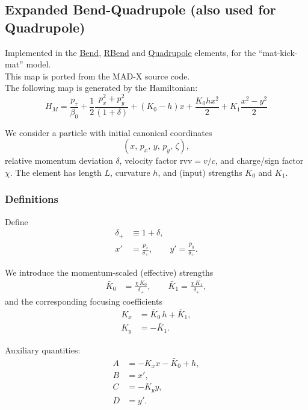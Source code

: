 \subsection{Expanded Bend-Quadrupole (also used for Quadrupole)}

Implemented in the \href{https://xsuite.readthedocs.io/en/latest/apireference.html#bend}{\underline{Bend}},
\href{https://xsuite.readthedocs.io/en/latest/apireference.html#rbend}{\underline{RBend}} and
\href{https://xsuite.readthedocs.io/en/latest/apireference.html#quadrupole}{\underline{Quadrupole}} elements,
for the ``mat-kick-mat'' model.
~\\
This map is ported from the MAD-X source code.
~\\

The following map is generated by the Hamiltonian:
\begin{equation}
  H_{M} = \frac{p_\tau}{\beta_0} +  \frac{1}{2}\frac{p_x^2 + p_y^2}{(1 + \delta)} + (K_0 -h)x + \frac{K_0hx^2}{2} + K_1 \frac{x^2-y^2}{2}
\end{equation}

We consider a particle with initial canonical coordinates
\[
(x,\, p_x,\, y,\, p_y,\, \zeta),
\]
relative momentum deviation $\delta$, velocity factor $\mathrm{rvv}=v/c$, and charge/sign factor $\chi$.
The element has length $L$, curvature $h$, and (input) strengths $K_0$ and $K_1$.

\subsubsection*{Definitions}

Define
\begin{align}
\delta_+ &\equiv 1+\delta, \\
x' &= \frac{p_x}{\delta_+}, \qquad
y' = \frac{p_y}{\delta_+}.
\end{align}

We introduce the momentum-scaled (effective) strengths
\begin{align}
\bar{K}_0 &= \frac{\chi\, K_0}{\delta_+}, \qquad
\bar{K}_1 = \frac{\chi\, K_1}{\delta_+},
\end{align}
and the corresponding focusing coefficients
\begin{align}
K_x &= \bar{K}_0\, h + \bar{K}_1, \\
K_y &= -\bar{K}_1 .
\end{align}

Auxiliary quantities:
\begin{align}
A &= -K_x x - \bar{K}_0 + h, \\
B &= x', \\
C &= -K_y y, \\
D &= y'.
\end{align}

